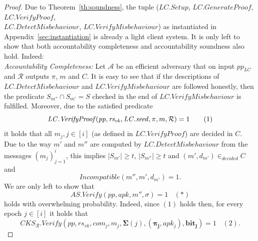 \begin{proof}
\noindent Due to Theorem~\ref{th:soundness}, the tuple 
($\mathit{LC.Setup}$, $\mathit{LC.GenerateProof}$, $\mathit{LC.VerifyProof}$, \\ $\mathit{LC.DetectMisbehaviour}$, 
$\mathit{LC.VerifyMisbehaviour}$) as instantiated in Appendix~\ref{sec:instantiation} is already a light client system. 
It is only left to show that both accountability completeness and accountability soundness also hold. Indeed: \\

\noindent \textit{Accountability Completeness:} %
Let $\mathcal{A}$ be an efficient adversary that on input $\mathit{pp_{\mathit{LC}}}$ and $\mathcal{R}$ outputs 
 $\pi$, $m$ and $C$. It is easy to see that if the descriptions of $\mathit{LC.DetectMisbehaviour}$ and $\mathit{LC.VerifyMisbehaviour}$ are followed honestly,  
then the predicate $S_{m''} \cap S_{m'} = S$ checked in the end of $\mathit{LC.VerifyMisbehaviour}$ is fulfilled. Moreover, due to the satisfied predicate
$$\mathit{LC.VerifyProof}(\mathit{pp}, \mathit{rs_{\mathit{vk}}}, \LCseed, \pi, m, \mathcal{R}) = 1 \ \ \ \ \ \ (1)$$ %
it holds that all $m_j, j \in [i]$ (as defined in $\mathit{LC.VerifyProof}$) are decided in $C$. Due to the way $m'$ and $m''$ are computed 
by $\mathit{LC.DetectMisbehaviour}$ from the messages $(m_j)_{j=1}^i$, this implies $|S_{m'}| \geq t$, $|S_{m''}| \geq t$ and $(\mathit{m'}, d_{\mathit{m'}}) \in_{\mathit{decided}} C$ and 
 $$\mathit{Incompatible(m'', m', d_{m'})} = 1.$$ We are only left to show that 
 $$\mathit{AS.Verify}(\mathit{pp}, \mathit{apk}, m'', \sigma) =1 \ \ \ \ (*)$$ 
\noindent holds with overwhelming probability. Indeed, since $(1)$ holds then, for every epoch $j \in [i]$ it holds that 
$$\mathit{CKS_{\mathcal{R}}.Verify}(\mathit{pp},  \mathit{rs_{\mathit{vk}}}, \mathit{com_j}, m_j,  \mathbf{\Sigma}(j), (\mathbf{\pi_{j}},\mathit{apk_j}), 
\mathbf{bit_j}) = 1 \ \ \ \ (2).$$

\end{proof}
